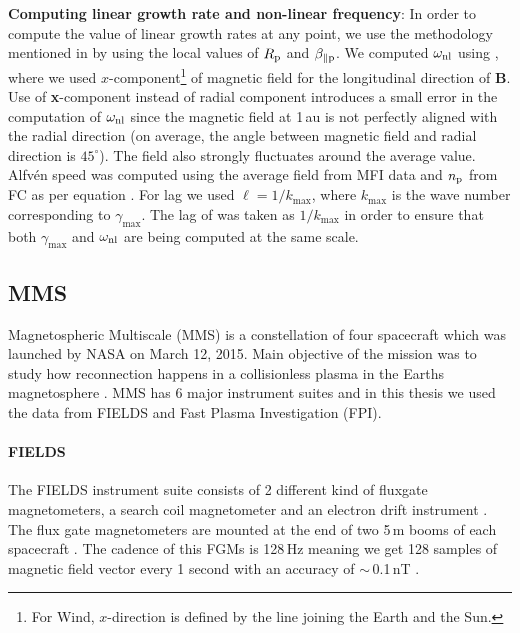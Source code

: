                 \textbf{Computing linear growth rate and non-linear frequency}: In order to compute
                the value of linear growth rates at any point, we use the methodology mentioned in
                 by using the local values of $R_{\rm p}$ and $\beta_{\parallel \rm
                p}$. We computed $\omega_{\rm nl}$ using , where we used
                $x$-component\footnote{For Wind, $x$-direction is defined by the line joining the
                Earth and the Sun.} of magnetic field for the longitudinal direction of \textbf{B}.
                Use of \textbf{x}-component instead of radial component introduces a small error in
                the computation of $\omega_{\rm nl}$ since the magnetic field at 1\,au is not
                perfectly aligned with the radial direction (on average, the angle between magnetic
                field and radial direction is $45^\circ$). The field also strongly fluctuates around
                the average value. Alfv\'en speed was computed using the average field from MFI data
                and $n_{\rm p}$ from FC as per equation . For lag we used $\ell =
                1/k_{\max}$, where $k_{\max}$ is the wave number corresponding to $\gamma_{\max}$.
                The lag of was taken as $1/k_{\max}$ in order to ensure that both $\gamma_{\max}$
                and $\omega_{\rm nl}$ are being computed at the same scale.

        \subsection{MMS}\label{sec:mms}

            Magnetospheric Multiscale (MMS) is a constellation of four spacecraft which was launched
            by NASA on March 12, 2015. Main objective of the mission was to study how reconnection
            happens in a collisionless plasma in the Earths magnetosphere \citep{Russell2016}. MMS
            has 6 major instrument suites \citep{Russell2016} and in this thesis we used the data
            from FIELDS and Fast Plasma Investigation (FPI).

            \paragraph*{FIELDS} \label{sec:fields}

                The FIELDS instrument suite consists of 2 different kind of fluxgate magnetometers,
                a search coil magnetometer and an electron drift instrument \citep{Torbert2016}. The
                flux gate magnetometers are mounted at the end of two 5\,m booms of each spacecraft
                \citep{Russell2016}. The cadence of this FGMs is 128\,Hz meaning we get 128 samples
                of magnetic field vector every 1 second with an accuracy of $\sim$\,0.1\,nT
                \citep{Russell2016, Torbert2016}.

